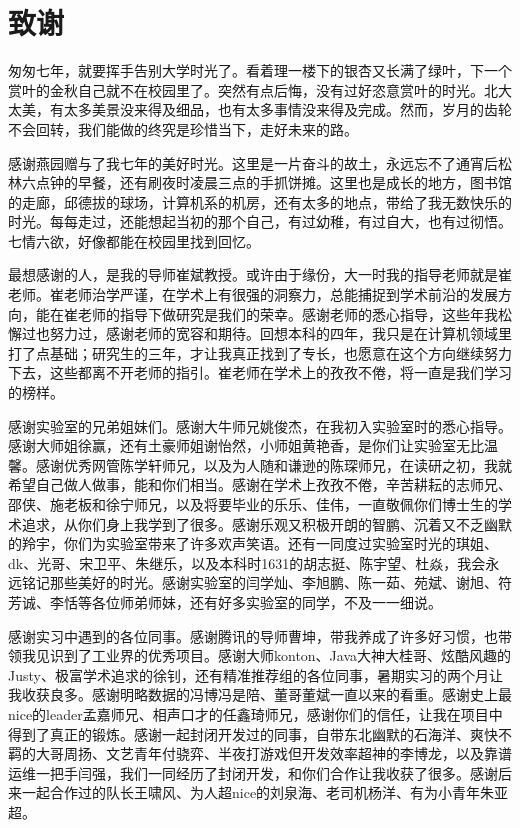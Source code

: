 
\chapter{致谢}

匆匆七年，就要挥手告别大学时光了。看着理一楼下的银杏又长满了绿叶，下一个赏叶的金秋自己就不在校园里了。突然有点后悔，没有过好恣意赏叶的时光。北大太美，有太多美景没来得及细品，也有太多事情没来得及完成。然而，岁月的齿轮不会回转，我们能做的终究是珍惜当下，走好未来的路。

感谢燕园赠与了我七年的美好时光。这里是一片奋斗的故土，永远忘不了通宵后松林六点钟的早餐，还有刷夜时凌晨三点的手抓饼摊。这里也是成长的地方，图书馆的走廊，邱德拔的球场，计算机系的机房，还有太多的地点，带给了我无数快乐的时光。每每走过，还能想起当初的那个自己，有过幼稚，有过自大，也有过彻悟。七情六欲，好像都能在校园里找到回忆。

最想感谢的人，是我的导师崔斌教授。或许由于缘份，大一时我的指导老师就是崔老师。崔老师治学严谨，在学术上有很强的洞察力，总能捕捉到学术前沿的发展方向，能在崔老师的指导下做研究是我们的荣幸。感谢老师的悉心指导，这些年我松懈过也努力过，感谢老师的宽容和期待。回想本科的四年，我只是在计算机领域里打了点基础；研究生的三年，才让我真正找到了专长，也愿意在这个方向继续努力下去，这些都离不开老师的指引。崔老师在学术上的孜孜不倦，将一直是我们学习的榜样。

感谢实验室的兄弟姐妹们。感谢大牛师兄姚俊杰，在我初入实验室时的悉心指导。感谢大师姐徐赢，还有土豪师姐谢怡然，小师姐黄艳香，是你们让实验室无比温馨。感谢优秀网管陈学轩师兄，以及为人随和谦逊的陈琛师兄，在读研之初，我就希望自己做人做事，能和你们相当。感谢在学术上孜孜不倦，辛苦耕耘的志师兄、邵侠、施老板和徐宁师兄，以及将要毕业的乐乐、佳伟，一直敬佩你们博士生的学术追求，从你们身上我学到了很多。感谢乐观又积极开朗的智鹏、沉着又不乏幽默的羚宇，你们为实验室带来了许多欢声笑语。还有一同度过实验室时光的琪姐、dk、光哥、宋卫平、朱继乐，以及本科时1631的胡志挺、陈宇望、杜焱，我会永远铭记那些美好的时光。感谢实验室的闫学灿、李旭鹏、陈一茹、苑斌、谢旭、符芳诚、李恬等各位师弟师妹，还有好多实验室的同学，不及一一细说。

感谢实习中遇到的各位同事。感谢腾讯的导师曹坤，带我养成了许多好习惯，也带领我见识到了工业界的优秀项目。感谢大师konton、Java大神大桂哥、炫酷风趣的Justy、极富学术追求的徐钊，还有精准推荐组的各位同事，暑期实习的两个月让我收获良多。感谢明略数据的冯博冯是陪、董哥董斌一直以来的看重。感谢史上最nice的leader孟嘉师兄、相声口才的任鑫琦师兄，感谢你们的信任，让我在项目中得到了真正的锻炼。感谢一起封闭开发过的同事，自带东北幽默的石海洋、爽快不羁的大哥周扬、文艺青年付骁弈、半夜打游戏但开发效率超神的李博龙，以及靠谱运维一把手闫强，我们一同经历了封闭开发，和你们合作让我收获了很多。感谢后来一起合作过的队长王啸风、为人超nice的刘泉海、老司机杨洋、有为小青年朱亚超。

